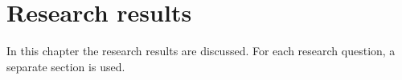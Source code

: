 \chapter{Research results}

In this chapter the research results are discussed.
For each research question, a separate section is used. 






